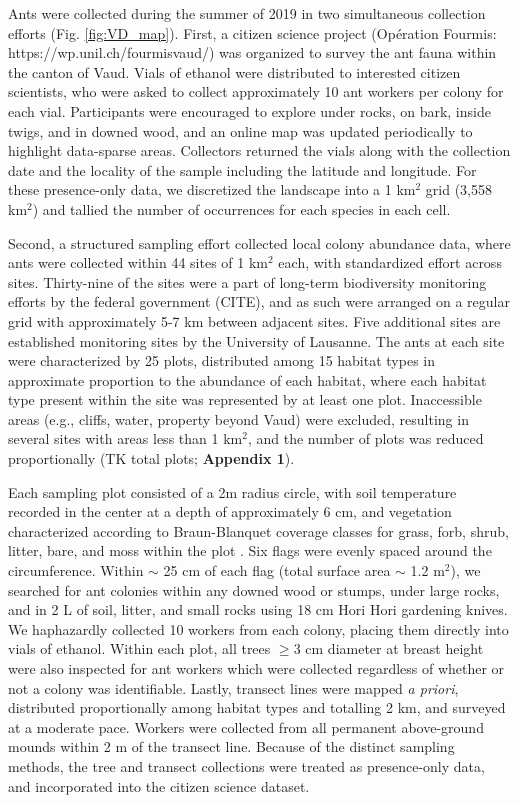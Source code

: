 \documentclass[preprint,review,times,12pt]{elsarticle}
\begin{document}
Ants were collected during the summer of 2019 in two simultaneous collection efforts (Fig. \ref{fig:VD_map}). First, a citizen science project (Opération Fourmis: https://wp.unil.ch/fourmisvaud/) was organized to survey the ant fauna within the canton of Vaud. Vials of ethanol were distributed to interested citizen scientists, who were asked to collect approximately 10 ant workers per colony for each vial. Participants were encouraged to explore under rocks, on bark, inside twigs, and in downed wood, and an online map was updated periodically to highlight data-sparse areas. Collectors returned the vials along with the collection date and the locality of the sample including the latitude and longitude. For these presence-only data, we discretized the landscape into a 1 km$^2$ grid (3,558 km$^2$) and tallied the number of occurrences for each species in each cell. 

Second, a structured sampling effort collected local colony abundance data, where ants were collected within 44 sites of 1 km$^2$ each, with standardized effort across sites. Thirty-nine of the sites were a part of long-term biodiversity monitoring efforts by the federal government (CITE), and as such were arranged on a regular grid with approximately 5-7 km between adjacent sites. Five additional sites are established monitoring sites by the University of Lausanne. The ants at each site were characterized by 25 plots, distributed among 15 habitat types \citep{Gago-Silva2017} in approximate proportion to the abundance of each habitat, where each habitat type present within the site was represented by at least one plot. Inaccessible areas (e.g., cliffs, water, property beyond Vaud) were excluded, resulting in several sites with areas less than 1 km$^2$, and the number of plots was reduced proportionally (TK total plots; \textbf{Appendix 1}). 

Each sampling plot consisted of a 2m radius circle, with soil temperature recorded in the center at a depth of approximately 6 cm, and vegetation characterized according to Braun-Blanquet coverage classes for grass, forb, shrub, litter, bare, and moss within the plot \citep{Douglas1978}. Six flags were evenly spaced around the circumference. Within $\sim$ 25 cm of each flag (total surface area $\sim$ 1.2 m$^2$), we searched for ant colonies within any downed wood or stumps, under large rocks, and in 2 L of soil, litter, and small rocks using 18 cm Hori Hori gardening knives. We haphazardly collected 10 workers from each colony, placing them directly into vials of ethanol. Within each plot, all trees $\geq$3 cm diameter at breast height were also inspected for ant workers which were collected regardless of whether or not a colony was identifiable. Lastly, transect lines were mapped \emph{a priori}, distributed proportionally among habitat types and totalling 2 km, and surveyed at a moderate pace. Workers were collected from all permanent above-ground mounds within 2 m of the transect line. Because of the distinct sampling methods, the tree and transect collections were treated as presence-only data, and incorporated into the citizen science dataset. 
\end{document}
